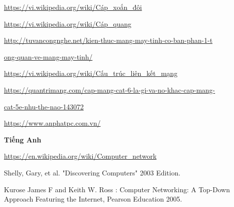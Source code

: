\documentclass{report}
\begin{document}
\smallskip
\url{https://vi.wikipedia.org/wiki/Cáp_xoắn_đôi}

\smallskip
\url{https://vi.wikipedia.org/wiki/Cáp_quang}

\smallskip
\url{http://tuvancongnghe.net/kien-thuc-mang-may-tinh-co-ban-phan-1-t}

\url{ong-quan-ve-mang-may-tinh/}

\smallskip
\url{https://vi.wikipedia.org/wiki/Cấu_trúc_liên_kết_mạng}

\smallskip
\url{https://quantrimang.com/cap-mang-cat-6-la-gi-va-no-khac-cap-mang-}

\url{cat-5e-nhu-the-nao-143072}

\smallskip
\url{https://www.anphatpc.com.vn/}

\changefontsizes{14pt}
\bigskip
\textbf{Tiếng Anh}

\changefontsizes{13pt}
\bigskip
\url{https://en.wikipedia.org/wiki/Computer_network}


\smallskip
Shelly, Gary, et al. "Discovering Computers" 2003 Edition.

\smallskip
Kurose James F and Keith W. Ross : Computer Networking: A Top-Down Approach Featuring the Internet, Pearson Education 2005.
\end{document}
